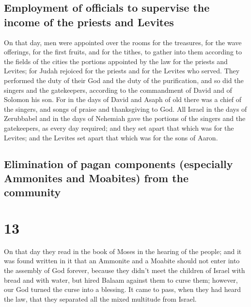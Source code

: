 \hypertarget{employment-of-officials-to-supervise-the-income-of-the-priests-and-levites}{%
\subsection{Employment of officials to supervise the income of the
priests and
Levites}\label{employment-of-officials-to-supervise-the-income-of-the-priests-and-levites}}

 On that day, men were appointed over the rooms for the
treasures, for the wave offerings, for the first fruits, and for the
tithes, to gather into them according to the fields of the cities the
portions appointed by the law for the priests and Levites; for Judah
rejoiced for the priests and for the Levites who served. 
They performed the duty of their God and the duty of the purification,
and so did the singers and the gatekeepers, according to the commandment
of David and of Solomon his son.  For in the days of
David and Asaph of old there was a chief of the singers, and songs of
praise and thanksgiving to God.  All Israel in the days
of Zerubbabel and in the days of Nehemiah gave the portions of the
singers and the gatekeepers, as every day required; and they set apart
that which was for the Levites; and the Levites set apart that which was
for the sons of Aaron.

\hypertarget{elimination-of-pagan-components-especially-ammonites-and-moabites-from-the-community}{%
\subsection{Elimination of pagan components (especially Ammonites and
Moabites) from the
community}\label{elimination-of-pagan-components-especially-ammonites-and-moabites-from-the-community}}

\hypertarget{section-12}{%
\section{13}\label{section-12}}

 On that day they read in the book of Moses in the hearing
of the people; and it was found written in it that an Ammonite and a
Moabite should not enter into the assembly of God forever,
 because they didn't meet the children of Israel with
bread and with water, but hired Balaam against them to curse them;
however, our God turned the curse into a blessing.  It
came to pass, when they had heard the law, that they separated all the
mixed multitude from Israel.

